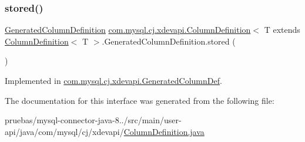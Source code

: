 \subsubsection{\texorpdfstring{stored()}{stored()}}
{\footnotesize\ttfamily \mbox{\hyperlink{interfacecom_1_1mysql_1_1cj_1_1xdevapi_1_1_column_definition_1_1_generated_column_definition}{Generated\+Column\+Definition}} \mbox{\hyperlink{interfacecom_1_1mysql_1_1cj_1_1protocol_1_1_column_definition}{com.\+mysql.\+cj.\+xdevapi.\+Column\+Definition}}$<$ T extends \mbox{\hyperlink{interfacecom_1_1mysql_1_1cj_1_1protocol_1_1_column_definition}{Column\+Definition}}$<$ T $>$.Generated\+Column\+Definition.\+stored (\begin{DoxyParamCaption}{ }\end{DoxyParamCaption})}



Implemented in \mbox{\hyperlink{classcom_1_1mysql_1_1cj_1_1xdevapi_1_1_generated_column_def_a7518aecc43b11bfa3f23ada2721fd845}{com.\+mysql.\+cj.\+xdevapi.\+Generated\+Column\+Def}}.



The documentation for this interface was generated from the following file\+:\begin{DoxyCompactItemize}
\item 
pruebas/mysql-\/connector-\/java-\/8../src/main/user-\/api/java/com/mysql/cj/xdevapi/\mbox{\hyperlink{user-api_2java_2com_2mysql_2cj_2xdevapi_2_column_definition_8java}{Column\+Definition.\+java}}\end{DoxyCompactItemize}
